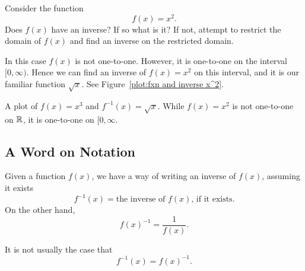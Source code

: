 \begin{example}
Consider the function
\[
f(x) = x^2.
\]
Does $f(x)$ have an inverse? If so what is it? If not, attempt to
restrict the domain of $f(x)$ and find an inverse on the restricted
domain.
\end{example}


\begin{solution}
In this case $f(x)$ is not one-to-one. However, it is one-to-one on
the interval $[0,\infty)$. Hence we can find an inverse of $f(x)=x^2$
  on this interval, and it is our familiar function $\sqrt{x}$.  See
  Figure~\ref{plot:fxn and inverse x^2}.
\end{solution}

\begin{marginfigure}[0in]
\caption{A plot of $f(x)=x^3$ and $f^{-1}(x) = \sqrt{x}$. While
  $f(x)=x^2$ is not one-to-one on $\mathbb{R}$, it is one-to-one on
  $[0,\infty$.}
\label{plot:fxn and inverse x^2}
\end{marginfigure}


\subsection{A Word on Notation}

Given a function $f(x)$, we have a way of writing an inverse of $f(x)$, assuming it exists
\[
f^{-1}(x) = \text{the inverse of $f(x)$, if it exists.}
\]
On the other hand,
\[
f(x)^{-1} = \frac{1}{f(x)}.
\]

\begin{warning}
It is not usually the case that 
\[
f^{-1}(x) = f(x)^{-1}.
\]
\end{warning}

